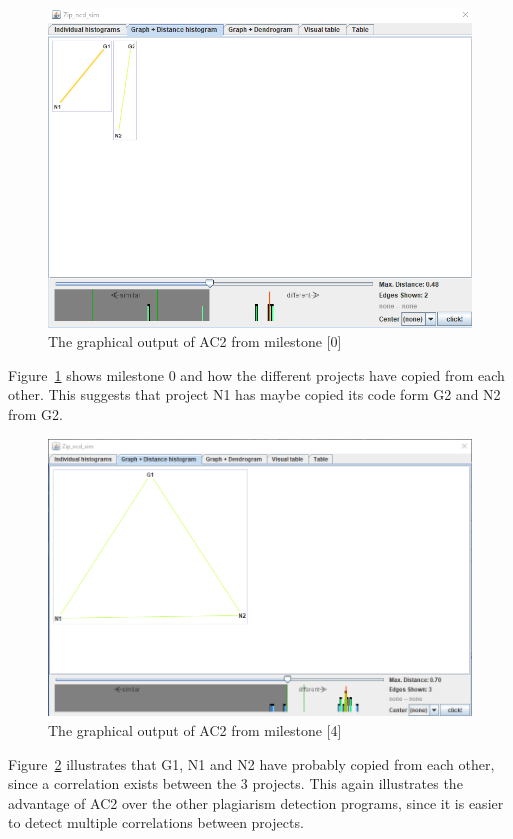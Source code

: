 \documentclass[a4paper, 11pt]{article}
\renewcommand{\\}{\vspace*{0.5\baselineskip} \newline}
\begin{document}
\begin{figure}[h]
	\centering
	\includegraphics[height=0.2\textheight]{figs/AC2/M0_1.png}
	\caption{The graphical output of AC2 from milestone [0]}
	\label{fig:AC2R1}
\end{figure}
Figure~\ref{fig:AC2R1} shows milestone 0 and how the different projects have copied from each other. This suggests that project N1 has maybe copied its code form G2 and N2 from G2.

\begin{figure}[h]
	\centering
		\includegraphics[height=0.2\textheight]{figs/AC2/M4_1.png}
		\caption{The graphical output of AC2 from milestone [4]}
		\label{fig:AC2R2}
\end{figure}

Figure~\ref{fig:AC2R2} illustrates that G1, N1 and N2 have probably copied from each other, since a correlation exists between the 3 projects. This again illustrates the advantage of AC2 over the other plagiarism detection programs, since it is easier to detect multiple correlations between projects.
\end{document}

